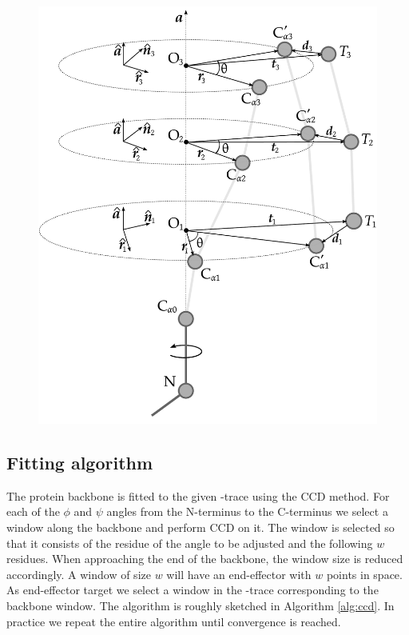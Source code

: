 \begin{figure}
  \centering
	\includegraphics[width=0.98\columnwidth]{figures/ccd}
  \caption{}
  \label{fig:ccd}
\end{figure}


\subsection{Fitting algorithm}
The protein backbone is fitted to the given \Ca-trace using the CCD method.
For each of the $\phi$ and $\psi$ angles from the N-terminus to the C-terminus we select a window along the backbone and perform CCD on it.
The window is selected so that it consists of the residue of the angle to be adjusted and the following $w$ residues. 
When approaching the end of the backbone, the window size is reduced accordingly.
A window of size $w$ will have an end-effector with $w$ points in space.
As end-effector target we select a window in the \Ca-trace corresponding to the backbone window. 
The algorithm is roughly sketched in Algorithm \ref{alg:ccd}.
In practice we repeat the entire algorithm until convergence is reached.

